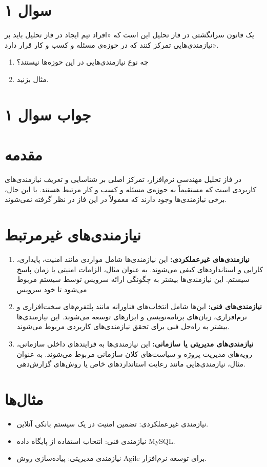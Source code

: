 \section*{سوال ۱}

یک قانون سرانگشتی در فاز تحلیل این است که «افراد تیم ایجاد در فاز تحلیل باید بر نیازمندی‌هایی تمرکز کنند که در حوزه‌ی مسئله و کسب و کار قرار دارد».
\begin{enumerate}
	\item چه نوع نیازمندی‌هایی در این حوزه‌ها نیستند؟
	\item مثال بزنید.
\end{enumerate}

\section*{جواب سوال ۱}


\section*{مقدمه}
در فاز تحلیل مهندسی نرم‌افزار، تمرکز اصلی بر شناسایی و تعریف نیازمندی‌های کاربردی است که مستقیماً به حوزه‌ی مسئله و کسب و کار مرتبط هستند. با این حال، برخی نیازمندی‌ها وجود دارند که معمولاً در این فاز در نظر گرفته نمی‌شوند.

\section*{نیازمندی‌های غیرمرتبط}
\begin{enumerate}
	
	\item \textbf{نیازمندی‌های غیرعملکردی:} این نیازمندی‌ها شامل مواردی مانند امنیت، پایداری، کارایی و استانداردهای کیفی می‌شوند. به عنوان مثال، الزامات امنیتی یا زمان پاسخ سیستم. این نیازمندی‌ها بیشتر به چگونگی ارائه سرویس توسط سیستم مربوط می‌شود تا خود سرویس
	
	\item \textbf{نیازمندی‌های فنی:} این‌ها شامل انتخاب‌های فناورانه مانند پلتفرم‌های سخت‌افزاری و نرم‌افزاری، زبان‌های برنامه‌نویسی و ابزارهای توسعه می‌شوند. این نیازمندی‌ها بیشتر به راه‌حل فنی برای تحقق نیازمندی‌های کاربردی مربوط می‌شوند.
	
	\item \textbf{نیازمندی‌های مدیریتی یا سازمانی:} این نیازمندی‌ها به فرایندهای داخلی سازمانی، رویه‌های مدیریت پروژه و سیاست‌های کلان سازمانی مربوط می‌شوند. به عنوان مثال، نیازمندی‌هایی مانند رعایت استانداردهای خاص یا روش‌های گزارش‌دهی.
	
\end{enumerate}

\section*{مثال‌ها}
\begin{itemize}
	\item نیازمندی غیرعملکردی: تضمین امنیت در یک سیستم بانکی آنلاین.
	\item نیازمندی فنی: انتخاب استفاده از پایگاه داده MySQL.
	\item نیازمندی مدیریتی: پیاده‌سازی روش Agile برای توسعه نرم‌افزار.
\end{itemize}